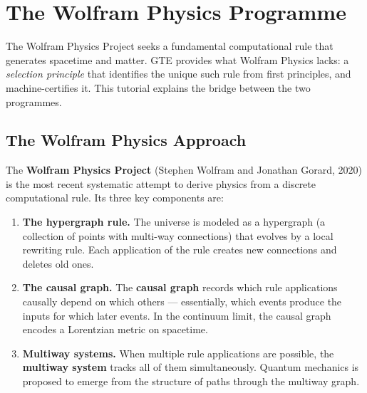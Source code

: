 \documentclass[11pt,a4paper]{article}
\newcommand{\term}[1]{\textbf{#1}}
\begin{document}
\section{The Wolfram Physics Programme}
\label{sec:wolfram_programme}

\begin{tcolorbox}[colback=boxblue,colframe=blue!40!black,
  title=What this tutorial addresses]
The Wolfram Physics Project seeks a fundamental computational rule that generates
spacetime and matter.  GTE provides what Wolfram Physics lacks: a \emph{selection
principle} that identifies the unique such rule from first principles, and
machine-certifies it.  This tutorial explains the bridge between the two programmes.
\end{tcolorbox}

\subsection{The Wolfram Physics Approach}

The \term{Wolfram Physics Project} (Stephen Wolfram and Jonathan Gorard, 2020) is
the most recent systematic attempt to derive physics from a discrete computational
rule.  Its three key components are:

\begin{enumerate}[itemsep=4pt]
  \item \textbf{The hypergraph rule.}  The universe is modeled as a hypergraph
    (a collection of points with multi-way connections) that evolves by a local
    rewriting rule.  Each application of the rule creates new connections and
    deletes old ones.

  \item \textbf{The causal graph.}  The \term{causal graph} records which rule
    applications causally depend on which others — essentially, which events
    produce the inputs for which later events.  In the continuum limit, the
    causal graph encodes a Lorentzian metric on spacetime.

  \item \textbf{Multiway systems.}  When multiple rule applications are possible,
    the \term{multiway system} tracks all of them simultaneously.  Quantum
    mechanics is proposed to emerge from the structure of paths through the
    multiway graph.
\end{enumerate}
\end{document}
